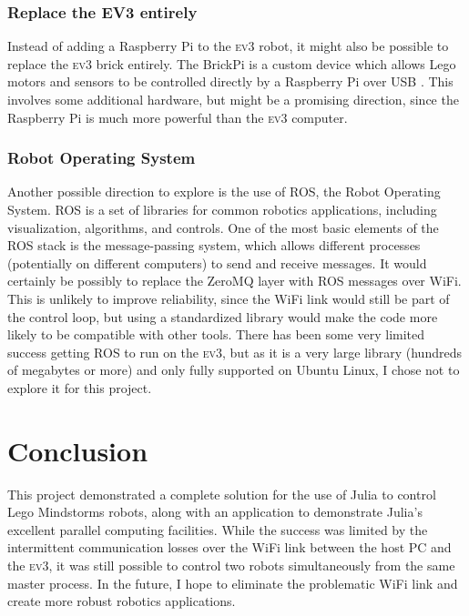 \documentclass[]{article}
\newcommand{\ev}{\textsc{ev3}}
\begin{document}
\subsubsection{Replace the EV3 entirely}
Instead of adding a Raspberry Pi to the \ev{} robot, it might also be possible to replace the \ev{} brick entirely. The BrickPi is a custom device which allows Lego motors and sensors to be controlled directly by a Raspberry Pi over USB \cite{dexter_industries_brickpi_2015}. This involves some additional hardware, but might be a promising direction, since the Raspberry Pi is much more powerful than the \ev{} computer. 

\subsubsection{Robot Operating System}
Another possible direction to explore is the use of ROS, the Robot Operating System. ROS is a set of libraries for common robotics applications, including visualization, algorithms, and controls. One of the most basic elements of the ROS stack is the message-passing system, which allows different processes (potentially on different computers) to send and receive messages. It would certainly be possibly to replace the ZeroMQ layer with ROS messages over WiFi. This is unlikely to improve reliability, since the WiFi link would still be part of the control loop, but using a standardized library would make the code more likely to be compatible with other tools. There has been some very limited success getting ROS to run on the \ev{}, but as it is a very large library (hundreds of megabytes or more) and only fully supported on Ubuntu Linux, I chose not to explore it for this project. 

\section{Conclusion}

This project demonstrated a complete solution for the use of Julia to control Lego Mindstorms robots, along with an application to demonstrate Julia's excellent parallel computing facilities. While the success was limited by the intermittent communication losses over the WiFi link between the host PC and the \ev{}, it was still possible to control two robots simultaneously from the same master process. In the future, I hope to eliminate the problematic WiFi link and create more robust robotics applications. 



\end{document}
